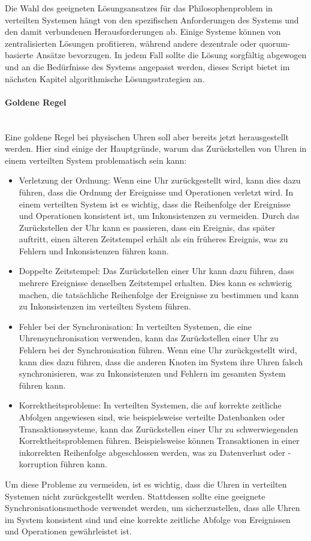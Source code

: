 \documentclass[../vs-script-first-v01.tex]{subfiles}
\begin{document}
Die Wahl des geeigneten Lösungsansatzes für das Philosophenproblem in verteilten Systemen hängt von den spezifischen Anforderungen des Systems und den damit verbundenen Herausforderungen ab. Einige Systeme können von zentralisierten Lösungen profitieren, während andere dezentrale oder quorum-basierte Ansätze bevorzugen. In jedem Fall sollte die Lösung sorgfältig abgewogen und an die Bedürfnisse des Systems angepasst werden, dieses Script bietet im nächsten Kapitel algorithmische Lösungsstrategien an.

\paragraph{Goldene Regel\\\\}
Eine goldene Regel bei physischen Uhren soll aber bereits jetzt herausgestellt werden. 
Hier sind einige der Hauptgründe, warum das Zurückstellen von Uhren in einem verteilten System problematisch sein kann:
\begin{itemize}
\item Verletzung der Ordnung: Wenn eine Uhr zurückgestellt wird, kann dies dazu führen, dass die Ordnung der Ereignisse und Operationen verletzt wird. In einem verteilten System ist es wichtig, dass die Reihenfolge der Ereignisse und Operationen konsistent ist, um Inkonsistenzen zu vermeiden. Durch das Zurückstellen der Uhr kann es passieren, dass ein Ereignis, das später auftritt, einen älteren Zeitstempel erhält als ein früheres Ereignis, was zu Fehlern und Inkonsistenzen führen kann.
\item Doppelte Zeitstempel: Das Zurückstellen einer Uhr kann dazu führen, dass mehrere Ereignisse denselben Zeitstempel erhalten. Dies kann es schwierig machen, die tatsächliche Reihenfolge der Ereignisse zu bestimmen und kann zu Inkonsistenzen im verteilten System führen.
\item Fehler bei der Synchronisation: In verteilten Systemen, die eine Uhrensynchronisation verwenden, kann das Zurückstellen einer Uhr zu Fehlern bei der Synchronisation führen. Wenn eine Uhr zurückgestellt wird, kann dies dazu führen, dass die anderen Knoten im System ihre Uhren falsch synchronisieren, was zu Inkonsistenzen und Fehlern im gesamten System führen kann.
\item Korrektheitsprobleme: In verteilten Systemen, die auf korrekte zeitliche Abfolgen angewiesen sind, wie beispielsweise verteilte Datenbanken oder Transaktionssysteme, kann das Zurückstellen einer Uhr zu schwerwiegenden Korrektheitsproblemen führen. Beispielsweise können Transaktionen in einer inkorrekten Reihenfolge abgeschlossen werden, was zu Datenverlust oder -korruption führen kann.
\end{itemize}
Um diese Probleme zu vermeiden, ist es wichtig, dass die Uhren in verteilten Systemen nicht zurückgestellt werden. Stattdessen sollte eine geeignete Synchronisationsmethode verwendet werden, um sicherzustellen, dass alle Uhren im System konsistent sind und eine korrekte zeitliche Abfolge von Ereignissen und Operationen gewährleistet ist.
\end{document}
